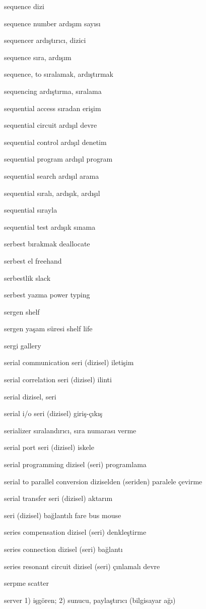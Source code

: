 \documentclass[12pt,fleqn]{article}\usepackage{../../common}
\begin{document}
sequence dizi

sequence number ardışım sayısı

sequencer ardıştırıcı, dizici

sequence sıra, ardışım

sequence, to sıralamak, ardıştırmak

sequencing ardıştırma, sıralama

sequential access sıradan erişim

sequential circuit ardışıl devre

sequential control ardışıl denetim

sequential program ardışıl program

sequential search ardışıl arama

sequential sıralı, ardışık, ardışıl

sequential sırayla

sequential test ardışık sınama

serbest bırakmak deallocate

serbest el freehand

serbestlik slack

serbest yazma power typing

sergen shelf

sergen yaşam süresi shelf life

sergi gallery

serial communication seri (dizisel) iletişim

serial correlation seri (dizisel) ilinti

serial dizisel, seri

serial i/o seri (dizisel) giriş-çıkış

serializer sıralandırıcı, sıra numarası verme

serial port seri (dizisel) iskele

serial programming dizisel (seri) programlama

serial to parallel conversion diziselden (seriden) paralele çevirme

serial transfer seri (dizisel) aktarım

seri (dizisel) bağlantılı fare bus mouse

series compensation dizisel (seri) denkleştirme

series connection dizisel (seri) bağlantı

series resonant circuit dizisel (seri) çınlamalı devre

serpme scatter

server 1) işgören; 2) sunucu, paylaştırıcı (bilgisayar ağı)
\end{document}
